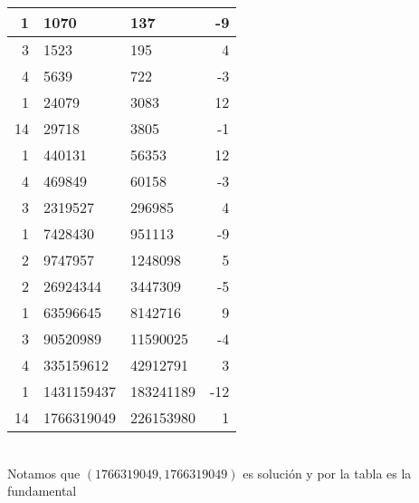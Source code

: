 \begin{sol}
\begin{enumerate}[label = (\roman*)]
\begin{tabular}{| r | l | l | r |}
			      1     & 1070       & 137       & -9   \\
			      \hline
			      3     & 1523       & 195       & 4    \\
			      \hline
			      4     & 5639       & 722       & -3   \\
			      \hline
			      1     & 24079      & 3083      & 12   \\
			      \hline
			      14    & 29718      & 3805      & -1   \\
			      \hline
			      1     & 440131     & 56353     & 12   \\
			      \hline
			      4     & 469849     & 60158     & -3   \\
			      \hline
			      3     & 2319527    & 296985    & 4    \\
			      \hline
			      1     & 7428430    & 951113    & -9   \\
			      \hline
			      2     & 9747957    & 1248098   & 5    \\
			      \hline
			      2     & 26924344   & 3447309   & -5   \\
			      \hline
			      1     & 63596645   & 8142716   & 9    \\
			      \hline
			      3     & 90520989   & 11590025  & -4   \\
			      \hline
			      4     & 335159612  & 42912791  & 3    \\
			      \hline
			      1     & 1431159437 & 183241189 & -12  \\
			      \hline
			      14    & 1766319049 & 226153980 & 1    \\
			      \hline
		      \end{tabular}\\
		      Notamos que $(1766319049,1766319049)$ es solución y por la tabla es la fundamental


\end{enumerate}
\end{sol}
